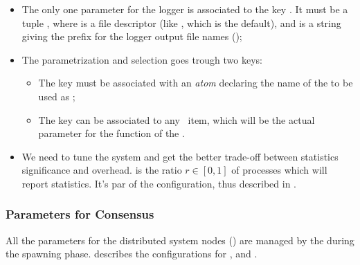     \begin{itemize}

        \item   The only one parameter for the logger is associated to the
                key . It must be a tuple , where  is a file descriptor
                (like , which is the default), and
                 is a string giving the prefix for the
                logger output file names
                ();

        \item   The  parametrization and selection goes
                trough two keys:
            \begin{itemize}
                \item   The  key must be associated with an
                        \emph{atom} declaring the name of the  to be used as ;
                
                \item   The  key can be associated to any
                        \Erlang\ item, which will be the actual parameter for the
                         function of the .
            \end{itemize}

        \item   We need to tune the system and get the better trade-off
                between statistics significance and overhead.
                 is the ratio $r \in [0, 1]$ of processes
                which will report statistics. It's par of the
                 configuration, thus described in
                .

    \end{itemize}

\subsubsection{Parameters for Consensus}
\label{subsub:ConfConsParams}

    All the parameters for the distributed system nodes
    () are managed by the
     during the spawning phase.
     describes the configurations for
    ,  and .


